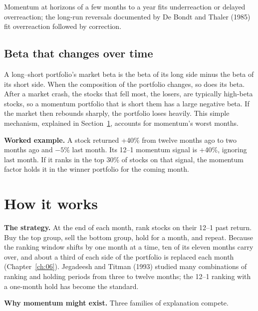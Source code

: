 Momentum at horizons of a few months to a year fits underreaction or delayed overreaction; the long-run reversals documented by De Bondt and Thaler (1985) fit overreaction followed by correction.

\subsection{Beta that changes over time}

A long--short portfolio's market beta is the beta of its long side minus the beta of its short side. When the composition of the portfolio changes, so does its beta. After a market crash, the stocks that fell most, the losers, are typically high-beta stocks, so a momentum portfolio that is short them has a large negative beta. If the market then rebounds sharply, the portfolio loses heavily. This simple mechanism, explained in Section~\ref{sec:09-how}, accounts for momentum's worst months.

\textbf{Worked example.} A stock returned +40\% from twelve months ago to two months ago and $-5$\% last month. Its 12--1 momentum signal is +40\%, ignoring last month. If it ranks in the top 30\% of stocks on that signal, the momentum factor holds it in the winner portfolio for the coming month.

\section{How it works}
\label{sec:09-how}

\textbf{The strategy.} At the end of each month, rank stocks on their 12--1 past return. Buy the top group, sell the bottom group, hold for a month, and repeat. Because the ranking window shifts by one month at a time, ten of its eleven months carry over, and about a third of each side of the portfolio is replaced each month (Chapter~\ref{ch:06}). Jegadeesh and Titman (1993) studied many combinations of ranking and holding periods from three to twelve months; the 12--1 ranking with a one-month hold has become the standard.

\textbf{Why momentum might exist.} Three families of explanation compete.

